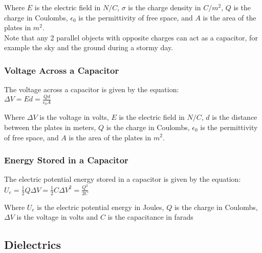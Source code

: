 Where $E$ is the electric field in $N/C$, $\sigma$ is the charge density in $C/m^2$, $Q$ is the charge in Coulombs, $\epsilon_0$ is the permittivity of free space, and $A$ is the area of the plates in $m^2$.\\

Note that any 2 parallel objects with opposite charges can act as a capacitor, for example the sky and the ground during a stormy day.\\


\subsubsection*{Voltage Across a Capacitor}

\hspace{.5cm} The voltage across a capacitor is given by the equation:\\

\vbox{
    \center
    $\Delta V = Ed = \frac{Qd}{\epsilon_0 A}$
}
\vspace{12pt}

Where $\Delta V$ is the voltage in volts, $E$ is the electric field in $N/C$, $d$ is the distance between the plates in meters, $Q$ is the charge in Coulombs, $\epsilon_0$ is the permittivity of free space, and $A$ is the area of the plates in $m^2$.\\


\subsubsection*{Energy Stored in a Capacitor}
\hspace{.5cm} The electric potential energy stored in a capacitor is given by the equation:\\
\vbox {
    \center
    $U_e = \frac{1}{2}Q\Delta V = \frac{1}{2}C\Delta V^2 = \frac{Q^2}{2C}$
}
\vspace{12pt}

Where $U_e$ is the electric potential energy in Joules, $Q$ is the charge in Coulombs, $\Delta V$ is the voltage in volts and $C$ is the capacitance in farads\\

\vspace{12pt}
\hrulefill

\begin{center}
    \subsection*{Dielectrics}
\end{center}

